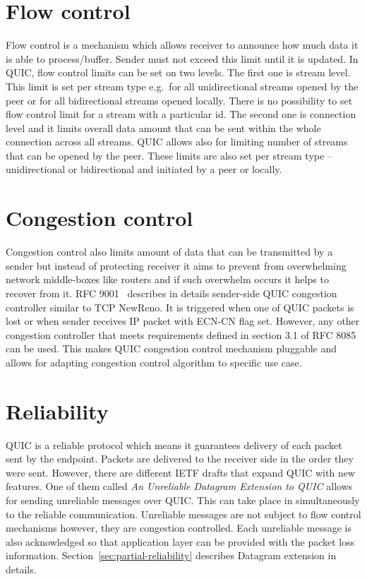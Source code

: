 \section{Flow control}
\label{sec:flow-control-and-congestion-control}
Flow control is a mechanism which allows receiver to announce how much data it is able to process/buffer.
Sender must not exceed this limit until it is updated.
In QUIC, flow control limits can be set on two levels.
The first one is stream level.
This limit is set per stream type e.g.\ for all unidirectional streams opened by the peer or for all bidirectional streams opened locally.
There is no possibility to set flow control limit for a stream with a particular id.
The second one is connection level and it limits overall data amount that can be sent within the whole connection across all streams.
QUIC allows also for limiting number of streams that can be opened by the peer.
These limits are also set per stream type -- unidirectional or bidirectional and initiated by a peer or locally.

\section{Congestion control}
\label{sec:congestion-control}
Congestion control also limits amount of data that can be transmitted by a sender but instead of protecting receiver it aims to prevent from overwhelming network middle-boxes like routers and if such overwhelm occurs it helps to recover from it.
RFC 9001~\cite{rfc9001} describes in details sender-side QUIC congestion controller similar to TCP NewReno.
It is triggered when one of QUIC packets is lost or when sender receives IP packet with ECN-CN flag set.
However, any other congestion controller that meets requirements defined in section 3.1 of RFC 8085~\cite{rfc8085} can be used.
This makes QUIC congestion control mechanism pluggable and allows for adapting congestion control algorithm to specific use case.

\section{Reliability}
\label{sec:reliability}
QUIC is a reliable protocol which means it guarantees delivery of each packet sent by the endpoint.
Packets are delivered to the receiver side in the order they were sent.
However, there are different IETF drafts that expand QUIC with new features.
One of them called \textit{An Unreliable Datagram Extension to QUIC}\cite{bider-ssh-quic-09} allows for sending unreliable messages over QUIC\@.
This can take place in simultaneously to the reliable communication.
Unreliable messages are not subject to flow control mechanisms however, they are congestion controlled.
Each unreliable message is also acknowledged so that application layer can be provided with the packet loss information.
Section~\ref{sec:partial-reliability} describes Datagram extension in details.

